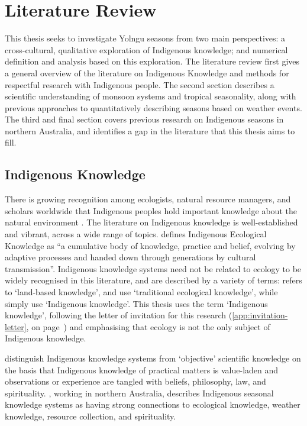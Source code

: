 \chapter{Literature Review}
\label{ch:lit-review}

This thesis seeks to investigate Yolngu seasons from two main perspectives:
a cross-cultural, qualitative exploration of Indigenous knowledge; and
numerical definition and analysis based on this exploration.
%
The literature review first gives a general
overview of the literature on Indigenous Knowledge and methods for respectful
research with Indigenous people.  The second section describes a scientific
understanding of monsoon systems and tropical seasonality, along with previous
approaches to quantitatively describing seasons based on weather events.
The third and final section covers previous research on Indigenous seasons in northern
Australia, and identifies a gap in the literature that this thesis aims to fill.


\section{Indigenous Knowledge}
\label{sec:lit-iek}

There is growing recognition among ecologists, natural resource managers, and
scholars worldwide that Indigenous peoples hold important knowledge about the
natural environment \citep[see eg.][and many others]{clarke2009,prober2011,ens2014}.
The literature on Indigenous knowledge
is well-established and vibrant, across a wide range of topics.
\citet{berkes2012} defines Indigenous Ecological Knowledge as ``a cumulative
body of knowledge, practice and belief, evolving by adaptive processes and
handed down through generations by cultural transmission''.
%
Indigenous knowledge systems need not be related to ecology to be widely recognised in this literature,
and are described by a variety of terms:  \citet{clarke2009} refers to `land-based
knowledge', \citet{petheram2010} and \citet{turner2009} use `traditional
ecological knowledge', while \citet{cochran2015} simply use `Indigenous
knowledge'.  This thesis uses the term `Indigenous knowledge', following the
letter of invitation for this research (\cref{app:invitation-letter}, on page~\pageref{app:invitation-letter}) and
emphasising that ecology is not the only subject of Indigenous knowledge.


\citet{turner2009} distinguish Indigenous knowledge systems from `objective'
scientific knowledge on the basis that Indigenous knowledge of practical
matters is value-laden and observations or experience are tangled with beliefs,
philosophy, law, and spirituality.  \citet{woodward2012b}, working in northern
Australia, describes Indigenous seasonal knowledge systems as having strong connections
to ecological knowledge, weather knowledge, resource collection, and spirituality.

